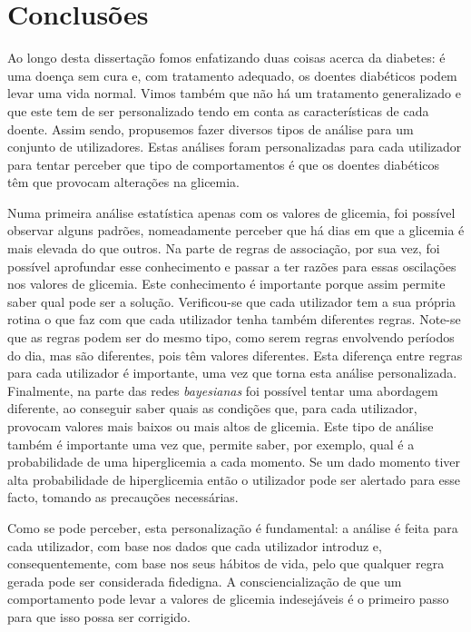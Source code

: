 \chapter{Conclusões}\label{chap:conc}

Ao longo desta dissertação fomos enfatizando duas coisas acerca da diabetes: é uma doença sem cura e, com tratamento adequado, os doentes diabéticos podem levar uma vida normal. Vimos também que não há um tratamento generalizado e que este tem de ser personalizado tendo em conta as características de cada doente. Assim sendo, propusemos fazer diversos tipos de análise para um conjunto de utilizadores. Estas análises foram personalizadas para cada utilizador para tentar perceber que tipo de comportamentos é que os doentes diabéticos têm que provocam alterações na glicemia.

Numa primeira análise estatística apenas com os valores de glicemia, foi possível observar alguns padrões, nomeadamente perceber que há dias em que a glicemia é mais elevada do que outros. Na parte de regras de associação, por sua vez, foi possível aprofundar esse conhecimento e passar a ter razões para essas oscilações nos valores de glicemia. Este conhecimento é importante porque assim permite saber qual pode ser a solução. Verificou-se que cada utilizador tem a sua própria rotina o que faz com que cada utilizador tenha também diferentes regras. Note-se que as regras podem ser do mesmo tipo, como serem regras envolvendo períodos do dia, mas são diferentes, pois têm valores diferentes. Esta diferença entre regras para cada utilizador é importante, uma vez que torna esta análise personalizada. Finalmente, na parte das redes \textit{bayesianas} foi possível tentar uma abordagem diferente, ao conseguir saber quais as condições que, para cada utilizador, provocam valores mais baixos ou mais altos de glicemia. Este tipo de análise também é importante uma vez que, permite saber, por exemplo, qual é a probabilidade de uma hiperglicemia a cada momento. Se um dado momento tiver alta probabilidade de hiperglicemia então o utilizador pode ser alertado para esse facto, tomando as precauções necessárias. 

Como se pode perceber, esta personalização é fundamental: a análise é feita para cada utilizador, com base nos dados que cada utilizador introduz e, consequentemente, com base nos seus hábitos de vida, pelo que qualquer regra gerada pode ser considerada fidedigna. A consciencialização de que um comportamento pode levar a valores de glicemia indesejáveis é o primeiro passo para que isso possa ser corrigido. 


